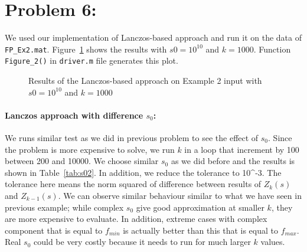 \newpage
\section*{Problem 6:}
We used our implementation of Lanczos-based approach and run it on the data of \texttt{FP\_Ex2.mat}. Figure~\ref{fig:fig2} shows the results with $s0 = 10^{10}$ and $k = 1000$.  Function \texttt{Figure\_2()} in \texttt{driver.m} file generates this plot. 

\begin{figure}[!tbh]
\centering        
   \caption{Results of the Lanczos-based approach on Example 2 input with $s0 = 10^{10}$ and $k = 1000$ }
   \label{fig:fig2}
\end{figure}

\paragraph{Lanczos approach with difference $s_{0}$:}  We runs similar test as we did in previous problem to see the effect of $s_{0}$. Since the problem is more expensive to solve, we run $k$ in a loop that increment by 100 between 200 and 10000. We choose similar $s_{0}$ as we did before and the results is shown in Table~\ref{tab:s02}. In addition, we reduce the tolerance to 10^{-3}. The tolerance here means the norm squared of difference between results of $Z_{k}(s)$ and $Z_{k-1}(s)$. We can observe similar behaviour similar to what we have seen in previous example; while complex $s_{0}$ give good approximation at smaller $k$, they are more expensive to evaluate. In addition, extreme cases with complex component that is equal to $f_{min}$ is actually better than this that is equal to $f_{max}$. Real $s_{0}$ could be very costly because it needs to run for much larger $k$ values. 


